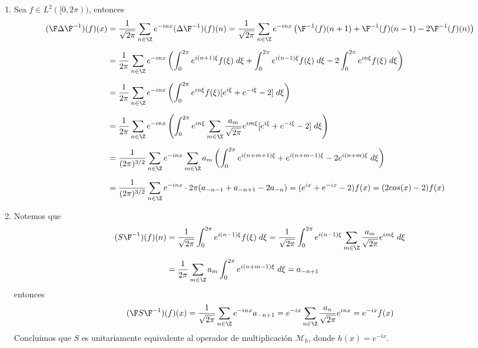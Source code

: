 \documentclass{article}
\begin{document}
\begin{enumerate}
    \item Sea $f\in L^{2}([0,2\pi))$, entonces
    \begin{align*}
        (\F\Delta\F^{-1})(f)(x)
        &= \frac{1}{\sqrt{2\pi}}\sum_{n\in\Z}e^{-inx}(\Delta\F^{-1})(f)(n) 
        =\frac{1}{\sqrt{2\pi}}\sum_{n\in\Z}e^{-inx}
        \left(\F^{-1}(f)(n+1)+\F^{-1}(f)(n-1)-2\F^{-1}(f)(n)\right) \\[2mm]
        &= \frac{1}{2\pi}\sum_{n\in\Z}e^{-inx}
        \left(\int_{0}^{2\pi}e^{i(n+1)\xi}f(\xi)\hspace{1mm}d\xi
        +\int_{0}^{2\pi}e^{i(n-1)\xi}f(\xi)\hspace{1mm}d\xi
        -2\int_{0}^{2\pi}e^{in\xi}f(\xi)\hspace{1mm}d\xi\right) \\[2mm]
        &= \frac{1}{2\pi}\sum_{n\in\Z}e^{-inx}\left(
            \int_{0}^{2\pi}e^{in\xi}f(\xi)[e^{i\xi}+e^{-i\xi}-2]\hspace{1mm}d\xi\right) \\[2mm]
        &= \frac{1}{2\pi}\sum_{n\in\Z}e^{-inx}\left(
            \int_{0}^{2\pi}e^{in\xi}\sum_{m\in\Z}\frac{a_{m}}{\sqrt{2\pi}}e^{im\xi}
            [e^{i\xi}+e^{-i\xi}-2]\hspace{1mm}d\xi\right) \\[2mm]
        &= \frac{1}{(2\pi)^{3/2}}\sum_{n\in\Z}e^{-inx}\sum_{m\in\Z}
        a_{m}\left(\int_{0}^{2\pi}e^{i(n+m+1)\xi}+e^{i(n+m-1)\xi}-2e^{i(n+m)\xi}\hspace{1mm}d\xi
        \right) \\[2mm]
        &= \frac{1}{(2\pi)^{3/2}}\sum_{n\in\Z}e^{-inx}\cdot2\pi(a_{-n-1}+a_{-n+1}-2a_{-n})
        =(e^{ix}+e^{-ix}-2)f(x)=(2cos(x)-2)f(x)
    \end{align*}
    
    \item Notemos que
    \begin{align*}
        (S\F^{-1})(f)(n)
        &= \frac{1}{\sqrt{2\pi}}\int_{0}^{2\pi}e^{i(n-1)\xi}f(\xi)\hspace{1mm}d\xi
        =\frac{1}{\sqrt{2\pi}}\int_{0}^{2\pi}e^{i(n-1)\xi}
        \sum_{m\in\Z}\frac{a_{m}}{\sqrt{2\pi}}e^{im\xi}\hspace{1mm}d\xi \\[2mm]
        &= \frac{1}{2\pi}\sum_{m\in\Z}a_{m}\int_{0}^{2\pi}e^{i(n+m-1)\xi}\hspace{1mm}d\xi=a_{-n+1}
    \end{align*}
    entonces
    \begin{equation*}
        (\F S\F^{-1})(f)(x)=\frac{1}{\sqrt{2\pi}}\sum_{n\in\Z}e^{-inx}a_{-n+1}
        =e^{-ix}\sum_{n\in\Z}\frac{a_{n}}{\sqrt{2\pi}}e^{inx}=e^{-ix}f(x)
    \end{equation*}
    Concluimos que $S$ es unitariamente equivalente al operador de multiplicación 
    $\mathcal{M}_{h}$, donde $h(x)=e^{-ix}$.
\end{enumerate}

\end{document}
